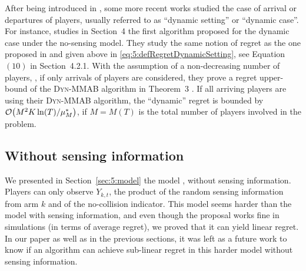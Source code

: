 After being introduced in \cite{Rosenski16}, some more recent works studied the case of arrival or departures of players, usually referred to as ``dynamic setting'' or ``dynamic case''.
For instance, \cite{BoursierPerchet18} studies in Section~4 the first algorithm proposed for the dynamic case under the no-sensing model.
They study the same notion of regret as the one proposed in \cite{Rosenski16} and given above in \eqref{eq:5:defRegretDynamicSetting}, see Equation $(10)$ in Section~4.2.1.
With the assumption of a non-decreasing number of players, \ie, if only arrivals of players are considered,
they prove a regret upper-bound of the \textsc{Dyn-MMAB} algorithm in Theorem~3 .
If all arriving players are using their \textsc{Dyn-MMAB} algorithm, the ``dynamic'' regret is bounded by $\mathop{}\mathopen{}\mathcal{O}\mathopen{}\left(M^2 K \ln(T) / \mu^*_{M}\right)$, if $M=M(T)$ is the total number of players involved in the problem.






\subsection{Without sensing information}
\label{sub:5:withoutSensing}

We presented in Section~\ref{sec:5:model} the model \modeltrois, without sensing information. Players can only observe $Y_{k,t}$, the product of the \iid{} random sensing information from arm $k$ and of the no-collision indicator.
This model seems harder than the model with sensing information, and even though the proposal \Selfish{} works fine in simulations (in terms of average regret), we proved that it can yield linear regret.
In our paper \cite{Besson2018ALT} as well as in the previous sections, it was left as a future work to know if an algorithm can achieve sub-linear regret in this harder model without sensing information.

